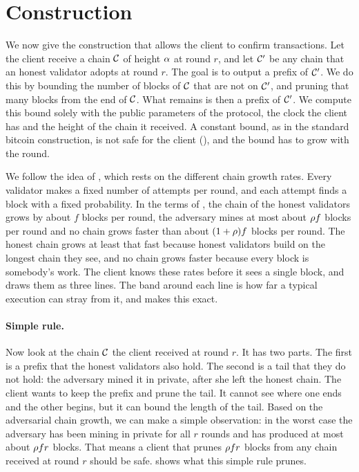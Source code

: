 \section{Construction}
\label{sec.construction}

We now give the construction that allows the client to confirm transactions. Let
the client receive a chain $\mathcal{C}$ of height $\alpha$ at round $r$, and let $\mathcal{C}'$
be any chain that an honest validator adopts at round $r$. The goal is to output
a prefix of $\mathcal{C}'$. We do this by bounding the number of blocks of $\mathcal{C}$ that
are not on $\mathcal{C}'$, and pruning that many blocks from the end of $\mathcal{C}$. What
remains is then a prefix of $\mathcal{C}'$. We compute this bound solely with the public
parameters of the protocol, the clock the client has and the height of the chain
it received. A constant bound, as in the standard bitcoin construction, is not
safe for the client (), and the bound has to grow with the
round.



We follow the idea of , which rests on the different chain
growth rates. Every validator makes a fixed number of attempts per round, and
each attempt finds a block with a fixed probability. In the terms of
, the chain of the honest validators grows by about $f$ blocks
per round, the adversary mines at most about $\rho f$ blocks per round and no chain
grows faster than about $(1+\rho)f$ blocks per round. The honest chain grows at
least that fast because honest validators build on the longest chain they see,
and no chain grows faster because every block is somebody's work. The client
knows these rates before it sees a single block, and  draws them
as three lines. The band around each line is how far a typical execution can
stray from it, and  makes this exact.

\paragraph{Simple rule.}

Now look at the chain $\mathcal{C}$ the client received at round $r$. It has two parts.
The first is a prefix that the honest validators also hold. The second is a
tail that they do not hold: the adversary mined it in private, after she left
the honest chain. The client wants to keep the prefix and prune the tail. It
cannot see where one ends and the other begins, but it can bound the length of
the tail. Based on the adversarial chain growth, we can make a simple
observation: in the worst case the adversary has been mining in private for all
$r$ rounds and has produced at most about $\rho fr$ blocks. That means a client that
prunes $\rho fr$ blocks from any chain received at round $r$ should be safe.
 shows what this simple rule prunes.

